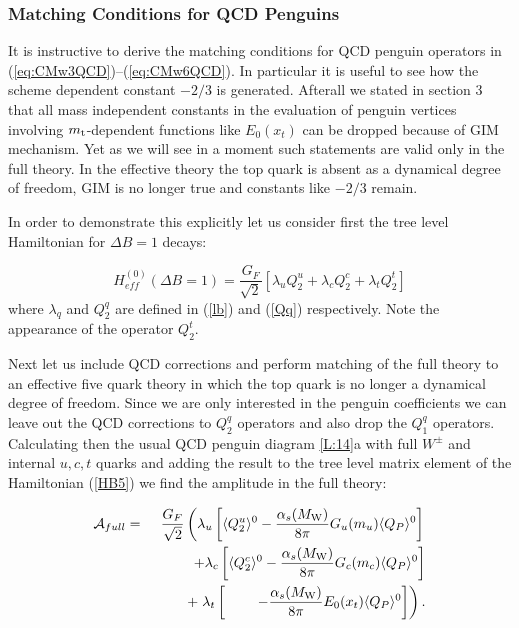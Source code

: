 \documentclass[12pt]{article}
\def\as{\alpha_s}
\newcommand{\mt}{m_{\rm t}}
\newcommand{\mw}{M_{\rm W}}
\begin{document}
\begin{itemize}
\begin{itemize}
\subsubsection{Matching Conditions for QCD Penguins}
It is instructive to derive the matching conditions for 
QCD penguin operators in (\ref{eq:CMw3QCD})--(\ref{eq:CMw6QCD}). 
In particular it is useful to
see how the scheme dependent constant $-2/3$ is generated.
Afterall we stated in section 3 that all mass independent
constants in the evaluation of penguin vertices involving
$\mt$-dependent functions like $E_0(x_t)$ can be dropped
because of GIM mechanism. Yet as we will see in a moment
such statements are valid only  in the full theory. In the effective
theory the top quark is absent as a dynamical degree of freedom,
GIM is no longer true and constants like $-2/3$ remain. 

In order to demonstrate this explicitly let us consider first
the tree level Hamiltonian for $\Delta B=1$ decays:

\begin{equation}\label{HB5}
H^{(0)}_{eff}(\Delta B=1)=\frac{G_F}{\sqrt{2}}
\left[\lambda_u Q^u_2
+\lambda_c Q^c_2
+\lambda_t Q^t_2 \right]
\end{equation}
where $\lambda_q$ and $Q^q_2$  are defined in (\ref{lb}) and (\ref{Qq})
respectively. Note the appearance of the operator $Q^t_2$.

Next let us include QCD corrections and perform matching of the
full theory to an effective five quark theory in which the top
quark is no longer a dynamical degree of freedom. Since we are
only interested in the penguin coefficients we can leave out
the QCD corrections to $Q^q_2$ operators and also drop the
$Q^q_1$ operators. Calculating then the usual QCD penguin diagram
\ref{L:14}a
with full $W^\pm$ and internal $u,c,t$ quarks and adding the result
to the tree level matrix element of the Hamiltonian (\ref{HB5})
we find the amplitude in the full theory:

\begin{eqnarray}\label{AMPFULL} 
{\cal A}_{full} & = &
\frac{G_F}{\sqrt{2}} 
 \left( \lambda_u \left[\langle Q^u_2 \rangle^0  
 -\frac{\as(\mw)}{8\pi} G_u(m_u) \langle Q_P\rangle ^0\right] \right.
\nonumber\\ 
&& ~~~~~~~+ \lambda_c \left[\langle Q^c_2 \rangle^0  
 -\frac{\as(\mw)}{8\pi} G_c(m_c) \langle Q_P\rangle ^0\right] 
\nonumber\\ 
&& ~~~~~~~+ \left.\lambda_t 
\left[~~~~~~~-\frac{\as(\mw)}{8\pi} E_0(x_t) 
\langle Q_P\rangle ^0\right] \right).
\end{eqnarray} 


\end{itemize}
\end{itemize}
\end{document}
